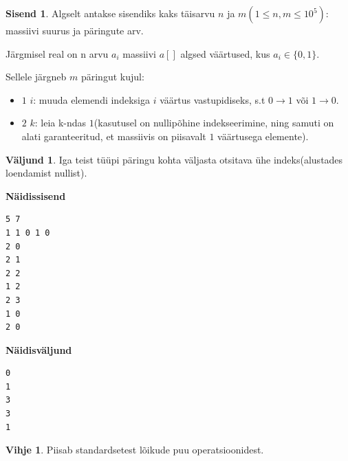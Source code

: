 \documentclass{trkut}
\theoremstyle{definition}
\newtheorem*{vihje}{Vihje}
\newtheorem*{Input}{Sisend}
\newtheorem*{Output}{Väljund}
\begin{document}
\begin{Input}
Algselt antakse sisendiks kaks täisarvu $n$ ja $m$$(1\le n, m\le 10^5)$: massiivi suurus ja päringute arv.

Järgmisel real on n arvu $a_i$ massiivi $a[]$ algsed väärtused, kus $a_i\in\{0, 1\}$.

Sellele järgneb $m$ päringut kujul:
\begin{itemize}
\item $1$ $i$: muuda elemendi indeksiga $i$ väärtus vastupidiseks, s.t $0\rightarrow 1$ või $1\rightarrow 0$. 
\item $2$ $k$: leia k-ndas $1$(kasutusel on nullipõhine indekseerimine, ning samuti on alati garanteeritud, et massiivis on piisavalt $1$ väärtusega elemente).
\end{itemize}
\end{Input}
\begin{Output}
Iga teist tüüpi päringu kohta väljasta otsitava ühe indeks(alustades loendamist nullist).
\end{Output}

\textbf{Näidissisend}

\begin{verbatim}
5 7
1 1 0 1 0
2 0
2 1
2 2
1 2
2 3
1 0
2 0
\end{verbatim}

\textbf{Näidisväljund}

\begin{verbatim}
0
1
3
3
1
\end{verbatim}


\begin{vihje}
Piisab standardsetest lõikude puu operatsioonidest.
\end{vihje}
\end{document}
